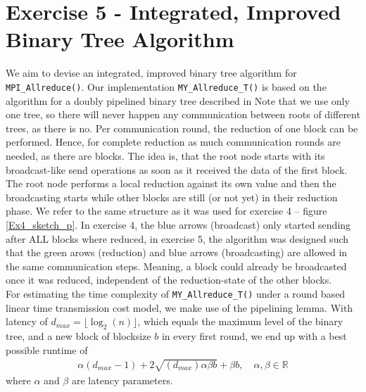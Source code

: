 \section{Exercise 5 - Integrated, Improved Binary Tree Algorithm}
\label{chapter_5_reference}

We aim to devise an integrated, improved binary tree algorithm for \texttt{MPI\_Allreduce()}. Our 
implementation \texttt{MY\_Allreduce\_T()} is based on the algorithm for a doubly pipelined binary 
tree described in \cite{treaeff_paper} Note that we use only one tree, so there will never happen any 
communication between roots of different trees, as there is no. Per communication round, the reduction of 
one block can be performed. Hence, for complete reduction as much communication rounds are needed, 
as there are blocks. The idea is, that the root node starts with its broadcast-like send operations 
as soon as it received the data of the first block. The root node performs a local reduction against 
its own value and then the broadcasting starts while other blocks are still (or not yet) 
in their reduction phase. We refer to the same structure as it was used for exercise 4 -- figure \ref{Ex4_sketch_p}.
In exercise 4, the blue arrows (broadcast) only started sending after ALL blocks where reduced, in exercise 5, 
the algorithm was designed such that the green arows (reduction) and blue arrows (broadcasting) are allowed in 
the same communication steps. Meaning, a block could already be broadcasted once it was reduced, independent 
of the reduction-state of the other blocks.\\


For estimating the time complexity of \texttt{MY\_Allreduce\_T()} under a round based linear time transmission 
cost model, we make use of the pipelining lemma. With latency of $d_{max} = \lfloor \log_2(n)\rfloor$, which 
equals the maximum level of the binary tree, and a new block of blocksize $b$ in every first round, we end up
with a best possible runtime of
\begin{align*}
    \alpha(d_{max}-1)+2\sqrt{(d_{max})\alpha\beta b} + \beta b, \quad \alpha,\beta \in \mathbb{R}
\end{align*}
where $\alpha$ and $\beta$ are latency parameters. 


